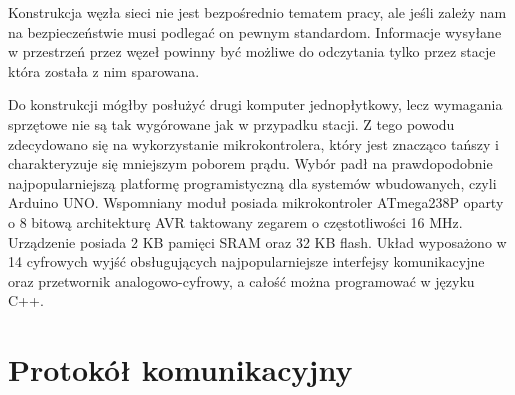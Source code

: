 \documentclass[12pt, twoside, openany]{mwrep}
\begin{document}
Konstrukcja węzła sieci nie jest bezpośrednio tematem pracy, ale jeśli zależy nam na bezpieczeństwie musi podlegać on pewnym standardom. Informacje wysyłane w przestrzeń przez węzeł powinny być możliwe do odczytania tylko przez stacje która została z nim sparowana.
\par
Do konstrukcji mógłby posłużyć drugi komputer jednopłytkowy, lecz wymagania sprzętowe nie są tak wygórowane jak w przypadku stacji. Z tego powodu zdecydowano się na wykorzystanie mikrokontrolera, który jest znacząco tańszy i charakteryzuje się mniejszym poborem prądu. Wybór padł na prawdopodobnie najpopularniejszą platformę programistyczną dla systemów wbudowanych, czyli Arduino UNO. Wspomniany moduł posiada mikrokontroler ATmega238P oparty o 8 bitową architekturę AVR taktowany zegarem o częstotliwości 16 MHz. Urządzenie posiada 2 KB pamięci SRAM oraz 32 KB flash. Układ wyposażono w 14 cyfrowych wyjść obsługujących najpopularniejsze interfejsy komunikacyjne oraz przetwornik analogowo-cyfrowy, a całość można programować w języku C++. 

\section{Protokół komunikacyjny}
\end{document}

